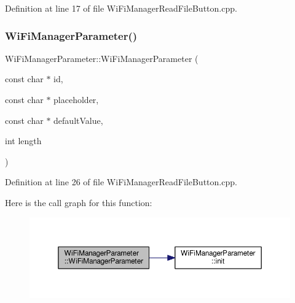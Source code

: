Definition at line 17 of file Wi\+Fi\+Manager\+Read\+File\+Button.\+cpp.

\mbox{\label{class_wi_fi_manager_parameter_a8e55ac907530d04ab60d30045e1382a1}} 
\subsubsection{\texorpdfstring{Wi\+Fi\+Manager\+Parameter()}{WiFiManagerParameter()}\hspace{0.1cm}{\footnotesize\ttfamily [2/3]}}
{\footnotesize\ttfamily Wi\+Fi\+Manager\+Parameter\+::\+Wi\+Fi\+Manager\+Parameter (\begin{DoxyParamCaption}\item[{const char $\ast$}]{id,  }\item[{const char $\ast$}]{placeholder,  }\item[{const char $\ast$}]{default\+Value,  }\item[{int}]{length }\end{DoxyParamCaption})}



Definition at line 26 of file Wi\+Fi\+Manager\+Read\+File\+Button.\+cpp.

Here is the call graph for this function\+:
\nopagebreak
\begin{figure}[H]
\begin{center}
\leavevmode
\includegraphics[width=350pt]{class_wi_fi_manager_parameter_a8e55ac907530d04ab60d30045e1382a1_cgraph}
\end{center}
\end{figure}
\mbox{\label{class_wi_fi_manager_parameter_a45967e1d29d52f5fc8e47e99cb693b98}} 
